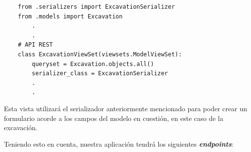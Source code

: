 \begin{itemize}
    \begin{verbatim}
    from .serializers import ExcavationSerializer
    from .models import Excavation
        .
        .
    # API REST
    class ExcavationViewSet(viewsets.ModelViewSet):
        queryset = Excavation.objects.all()
        serializer_class = ExcavationSerializer
        .
        .
    \end{verbatim}
        
        Esta vista utilizará el serializador anteriormente mencionado para poder crear
        un formulario acorde a los campos del modelo en cuestión, en este caso de la
        excavación.
    \end{itemize}

Teniendo esto en cuenta, nuestra aplicación tendrá los siguientes \textbf{\textit{endpoints}}:

